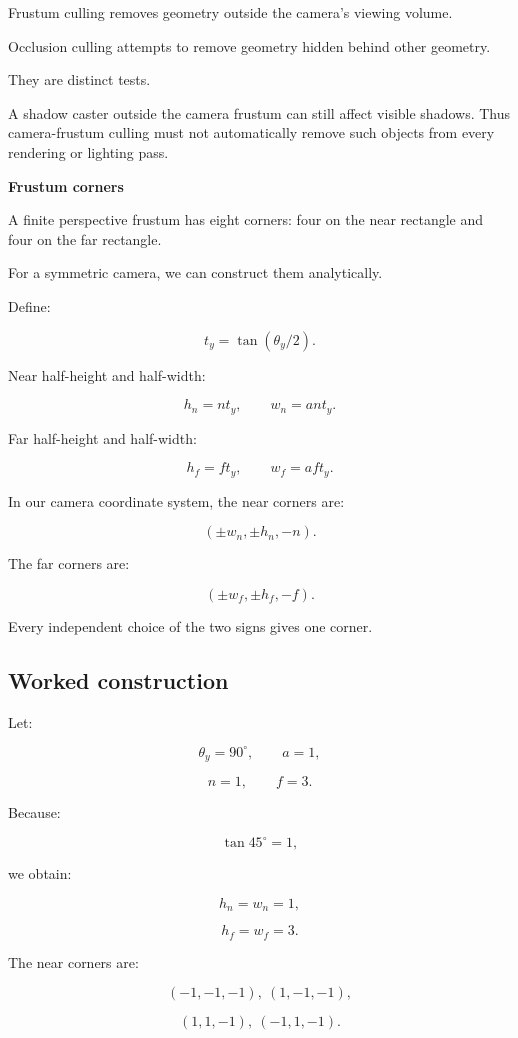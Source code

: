 Frustum culling removes geometry outside the camera's viewing volume.

Occlusion culling attempts to remove geometry hidden behind other geometry.

They are distinct tests.

A shadow caster outside the camera frustum can still affect visible shadows. Thus camera-frustum culling must not automatically remove such objects from every rendering or lighting pass.

\textbf{Frustum corners}

A finite perspective frustum has eight corners: four on the near rectangle and four on the far rectangle.

For a symmetric camera, we can construct them analytically.

Define:

\[
 t_y=\tan(\theta_y/2).
\]

Near half-height and half-width:

\[
 \boxed{ h_n=nt_y,\qquad w_n=ant_y }.
\]

Far half-height and half-width:

\[
 \boxed{ h_f=ft_y,\qquad w_f=aft_y }.
\]

In our camera coordinate system, the near corners are:

\[
 \boxed{ (\pm w_n,\pm h_n,-n) }.
\]

The far corners are:

\[
 \boxed{ (\pm w_f,\pm h_f,-f) }.
\]

Every independent choice of the two signs gives one corner.

\subsection{Worked construction}\label{02-foundations-ii-ch034-worked-construction}

Let:

\[
 \theta_y=90^\circ,\qquad a=1,
\]

\[
 n=1,\qquad f=3.
\]

Because:

\[
 \tan45^\circ=1,
\]

we obtain:

\[
 h_n=w_n=1,
\]

\[
 h_f=w_f=3.
\]

The near corners are:

\[
 (-1,-1,-1),\ (1,-1,-1),
\]

\[
 (1,1,-1),\ (-1,1,-1).
\]

